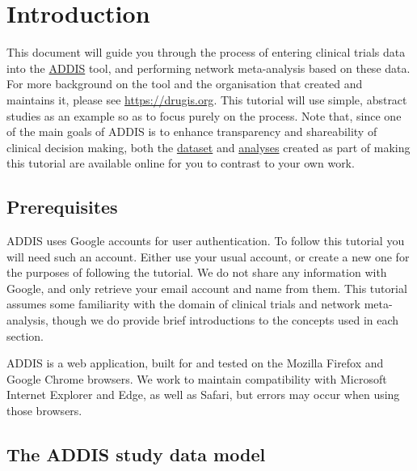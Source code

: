 \documentclass[12pt]{article}
\begin{document}
\maketitle

\tableofcontents

\section{Introduction}

This document will guide you through the process of entering clinical trials data into the \href{https://addis.drugis.org}{ADDIS} tool, and performing network meta-analysis based on these data.
For more background on the tool and the organisation that created and maintains it, please see \href{https://drugis.org}{https://drugis.org}.
This tutorial will use simple, abstract studies as an example so as to focus purely on the process.
Note that, since one of the main goals of ADDIS is to enhance transparency and shareability of clinical decision making, both the \href{https://addis.drugis.org/#/users/12/datasets/c190e953-051c-4cf5-ac10-332984a14a43}{dataset} and \href{https://addis.drugis.org/#/users/12/projects/1433}{analyses} created as part of making this tutorial are available online for you to contrast to your own work.

\subsection{Prerequisites}

ADDIS uses Google accounts for user authentication.
To follow this tutorial you will need such an account.
Either use your usual account, or create a new one for the purposes of following the tutorial.
We do not share any information with Google, and only retrieve your email account and name from them.
This tutorial assumes some familiarity with the domain of clinical trials and network meta-analysis, though we do provide brief introductions to the concepts used in each section.

ADDIS is a web application, built for and tested on the Mozilla Firefox and Google Chrome browsers.
We work to maintain compatibility with Microsoft Internet Explorer and Edge, as well as Safari, but errors may occur when using those browsers.

\subsection{The ADDIS study data model}
\end{document}
